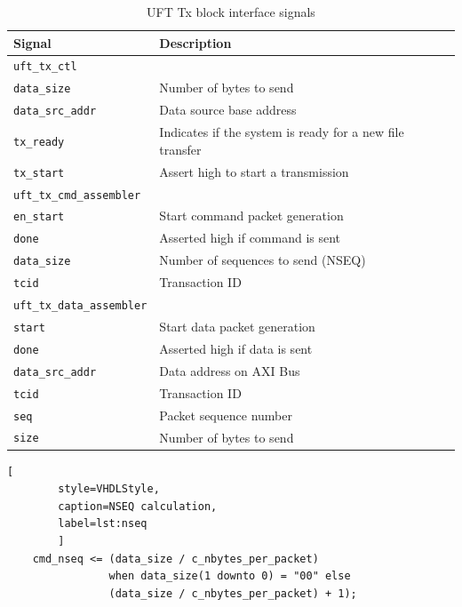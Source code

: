 \begin{table}[h!]
    \centering
    \begin{tabular}{l l}
        \toprule
        Signal & Description \\
        \midrule
        \texttt{uft\_tx\_ctl} & {} \\
        \midrule
        \texttt{data\_size} & Number of bytes to send\\
        \texttt{data\_src\_addr} & Data source base address \\
        \texttt{tx\_ready} & Indicates if the system is ready for a new file transfer \\
        \texttt{tx\_start} & Assert high to start a transmission \\

        \midrule
        \texttt{uft\_tx\_cmd\_assembler} & {} \\
        \midrule
        \texttt{en\_start} & Start command packet generation\\
        \texttt{done} & Asserted high if command is sent\\
        \texttt{data\_size} & Number of sequences to send (NSEQ)\\
        \texttt{tcid} & Transaction ID\\

        \midrule
        \texttt{uft\_tx\_data\_assembler} & {} \\
        \midrule
        \texttt{start} & Start data packet generation\\
        \texttt{done} & Asserted high if data is sent\\
        \texttt{data\_src\_addr} & Data address on AXI Bus\\
        \texttt{tcid} & Transaction ID \\
        \texttt{seq} & Packet sequence number\\
        \texttt{size} & Number of bytes to send\\
        \bottomrule
    \end{tabular}
    \caption{UFT Tx block interface signals}
    \label{tab:ufttxsig}
\end{table}

\clearpage
\begin{minipage}{\linewidth}
    \begin{lstlisting}[
        style=VHDLStyle, 
        caption=NSEQ calculation, 
        label=lst:nseq
        ]
    cmd_nseq <= (data_size / c_nbytes_per_packet)
                when data_size(1 downto 0) = "00" else
                (data_size / c_nbytes_per_packet) + 1);\end{lstlisting}
\end{minipage}

